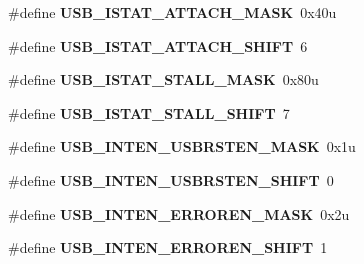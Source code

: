 \begin{DoxyCompactItemize}
\item 
\hypertarget{group___u_s_b___register___masks_gaad79229bb3a2c9199b50a86a8f4c49fa}{}\#define {\bfseries U\+S\+B\+\_\+\+I\+S\+T\+A\+T\+\_\+\+A\+T\+T\+A\+C\+H\+\_\+\+M\+A\+S\+K}~0x40u\label{group___u_s_b___register___masks_gaad79229bb3a2c9199b50a86a8f4c49fa}

\item 
\hypertarget{group___u_s_b___register___masks_ga7820c4cabf21bbbab066e4db9f2bb4b1}{}\#define {\bfseries U\+S\+B\+\_\+\+I\+S\+T\+A\+T\+\_\+\+A\+T\+T\+A\+C\+H\+\_\+\+S\+H\+I\+F\+T}~6\label{group___u_s_b___register___masks_ga7820c4cabf21bbbab066e4db9f2bb4b1}

\item 
\hypertarget{group___u_s_b___register___masks_gaab3ce766c4d9a80eaddf42589789ab2d}{}\#define {\bfseries U\+S\+B\+\_\+\+I\+S\+T\+A\+T\+\_\+\+S\+T\+A\+L\+L\+\_\+\+M\+A\+S\+K}~0x80u\label{group___u_s_b___register___masks_gaab3ce766c4d9a80eaddf42589789ab2d}

\item 
\hypertarget{group___u_s_b___register___masks_ga02df98ee1c82991ef063f89d4ef6ce2b}{}\#define {\bfseries U\+S\+B\+\_\+\+I\+S\+T\+A\+T\+\_\+\+S\+T\+A\+L\+L\+\_\+\+S\+H\+I\+F\+T}~7\label{group___u_s_b___register___masks_ga02df98ee1c82991ef063f89d4ef6ce2b}

\item 
\hypertarget{group___u_s_b___register___masks_ga67ed1b19b1fe4e25fc5ccf7bf0d42c38}{}\#define {\bfseries U\+S\+B\+\_\+\+I\+N\+T\+E\+N\+\_\+\+U\+S\+B\+R\+S\+T\+E\+N\+\_\+\+M\+A\+S\+K}~0x1u\label{group___u_s_b___register___masks_ga67ed1b19b1fe4e25fc5ccf7bf0d42c38}

\item 
\hypertarget{group___u_s_b___register___masks_gaf3b53207fe24da42d123d8e94494b72f}{}\#define {\bfseries U\+S\+B\+\_\+\+I\+N\+T\+E\+N\+\_\+\+U\+S\+B\+R\+S\+T\+E\+N\+\_\+\+S\+H\+I\+F\+T}~0\label{group___u_s_b___register___masks_gaf3b53207fe24da42d123d8e94494b72f}

\item 
\hypertarget{group___u_s_b___register___masks_gaf660b76755baff6ed122be3eba21723b}{}\#define {\bfseries U\+S\+B\+\_\+\+I\+N\+T\+E\+N\+\_\+\+E\+R\+R\+O\+R\+E\+N\+\_\+\+M\+A\+S\+K}~0x2u\label{group___u_s_b___register___masks_gaf660b76755baff6ed122be3eba21723b}

\item 
\hypertarget{group___u_s_b___register___masks_ga38c74121b3660065935c4f639f987b3c}{}\#define {\bfseries U\+S\+B\+\_\+\+I\+N\+T\+E\+N\+\_\+\+E\+R\+R\+O\+R\+E\+N\+\_\+\+S\+H\+I\+F\+T}~1\label{group___u_s_b___register___masks_ga38c74121b3660065935c4f639f987b3c}


\end{DoxyCompactItemize}
